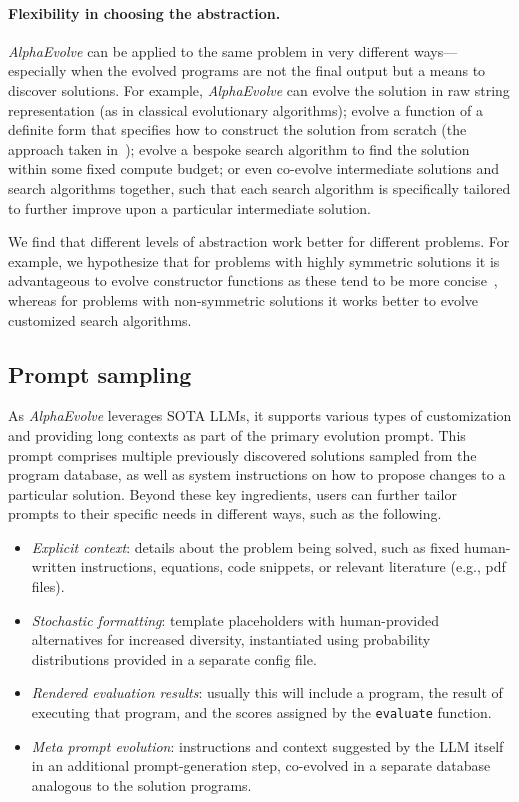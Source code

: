 \documentclass[logo,copyright,12pt]{googledeepmind}
\theoremstyle{definition}
\theoremstyle{remark}
\theoremstyle{plain}
\newcommand{\method}{\emph{AlphaEvolve}\xspace}
\begin{document}
\paragraph{Flexibility in choosing the abstraction.} \method can be applied to the same problem in very different ways---especially when the evolved programs are not the final output but a means to discover solutions.
For example, \method can evolve the solution in raw string representation (as in classical evolutionary algorithms); evolve a function of a definite form that specifies how to construct the solution from scratch (the approach taken in~\cite{paredes2023mathematical}); evolve a bespoke search algorithm to find the solution within some fixed compute budget; or even co-evolve intermediate solutions and search algorithms together, such that each search algorithm is specifically tailored to further improve upon a particular intermediate solution.

We find that different levels of abstraction work better for different problems.
For example, we hypothesize that for problems with highly symmetric solutions it is advantageous to evolve constructor functions as these tend to be more concise~\cite{paredes2023mathematical}, whereas for problems with non-symmetric solutions it works better to evolve customized search algorithms.


\subsection{Prompt sampling}
\label{subsec:prompting}

As \method leverages SOTA LLMs, it supports various types of customization and providing long contexts as part of the primary evolution prompt.
This prompt comprises multiple previously discovered solutions sampled from the program database, as well as system instructions on how to propose changes to a particular solution.
Beyond these key ingredients, users can further tailor prompts to their specific needs in different ways, such as the following.
\begin{itemize}
\item
\emph{Explicit context}: details about the problem being solved, such as fixed human-written instructions, equations, code snippets, or relevant literature (e.g., pdf files).
\item
\emph{Stochastic formatting}: template placeholders with human-provided alternatives for increased diversity, instantiated using probability distributions provided in a separate config file.
\item
\emph{Rendered evaluation results}: usually this will include a program, the result of executing that program, and the scores assigned by the \texttt{evaluate} function.
\item
\emph{Meta prompt evolution}: instructions and context suggested by the LLM itself in an additional prompt-generation step, co-evolved in a separate database analogous to the solution programs.
\end{itemize}
\end{document}

